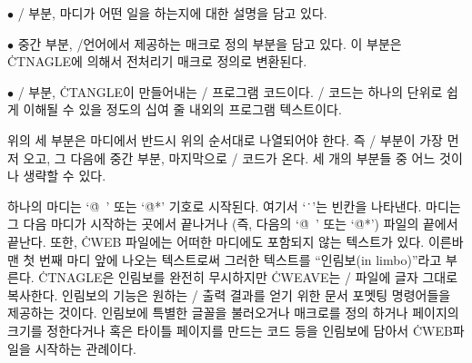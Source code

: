 \yskip\item{$\bullet$} \TEX/ 부분, 마디가 어떤 일을 하는지에 대한 설명을 담고 있다.

\item{$\bullet$} 중간 부분, \CEE/언어에서 제공하는 매크로 정의 부분을 담고
있다. 이 부분은 \.{CTNAGLE}에 의해서 전처리기 매크로 정의로 변환된다.

\item{$\bullet$} \CEE/ 부분, \.{CTANGLE}이 만들어내는 \CEE/ 프로그램 코드이다.
\CEE/ 코드는 하나의 단위로 쉽게 이해될 수 있을 정도의 십여 줄 내외의 프로그램 텍스트이다. 

\yskip\noindent 위의 세 부분은 마디에서 반드시 위의 순서대로 나열되어야 한다. 
즉 \TEX/ 부분이 가장 먼저 오고, 그 다음에 중간 부분, 마지막으로 \CEE/ 코드가 온다.
세 개의 부분들 중 어느 것이나 생략할 수 있다.

하나의 마디는 `\.{@\ }' 또는 `\.{@*}' 기호로 시작된다. 여기서 `\.{\ }'는 빈칸을
나타낸다. 마디는 그 다음 마디가 시작하는 곳에서 끝나거나
(즉, 다음의 `\.{@\ }' 또는 `\.{@*}') 파일의 끝에서 끝난다. 또한, \.{CWEB} 
파일에는 어떠한 마디에도 포함되지 않는 텍스트가 있다. 이른바 맨 첫 번째
마디 앞에 나오는 텍스트로써 그러한 텍스트를 ``인림보(in limbo)''라고 부른다.
\.{CTNAGLE}은 인림보를 완전히 무시하지만 \.{CWEAVE}는 \TEX/ 파일에
글자 그대로 복사한다. 인림보의 기능은 원하는 \TEX/ 출력 결과를 얻기 위한 문서
포멧팅 명령어들을 제공하는 것이다. 인림보에 특별한 글꼴을 불러오거나 매크로를 정의 
하거나 페이지의 크기를 정한다거나 혹은 타이틀 페이지를 만드는 코드 등을
인림보에 담아서 \.{CWEB}파일을 시작하는 관례이다.


